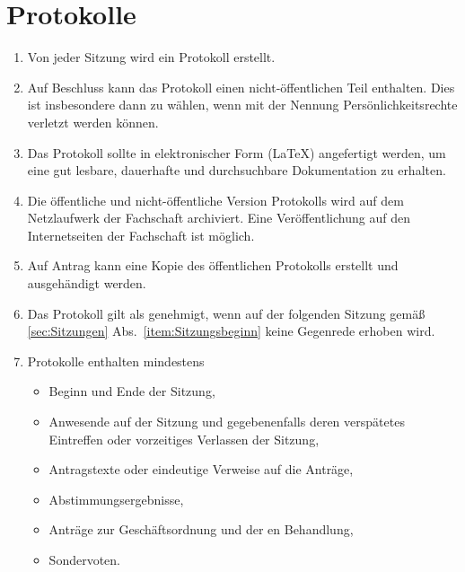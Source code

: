 \section{Protokolle}
\label{sec:protokolle}
\begin{enumerate}
	\item Von jeder Sitzung wird ein Protokoll erstellt.
	\item Auf Beschluss kann das Protokoll einen nicht-öffentlichen Teil enthalten.
	Dies ist insbesondere dann zu wählen, wenn mit der Nennung Persönlichkeitsrechte verletzt werden können.
	\item Das Protokoll sollte in elektronischer Form (\LaTeX) angefertigt werden, um eine gut lesbare, dauerhafte und durchsuchbare Dokumentation zu erhalten.
	\item Die öffentliche und nicht-öffentliche Version Protokolls wird auf dem Netzlaufwerk der Fachschaft archiviert.
	Eine Veröffentlichung auf den Internetseiten der Fachschaft ist möglich.
	\item Auf Antrag kann eine Kopie des öffentlichen Protokolls erstellt und ausgehändigt werden.
	\item Das Protokoll gilt als genehmigt, wenn auf der folgenden Sitzung gemäß \ref{sec:Sitzungen} Abs.~\ref{item:Sitzungsbeginn} keine Gegenrede erhoben wird.
	\item Protokolle enthalten mindestens
	\begin{itemize}
		\item Beginn und Ende der Sitzung,
		\item Anwesende auf der Sitzung und gegebenenfalls deren verspätetes Eintreffen oder vorzeitiges Verlassen der Sitzung,
		\item Antragstexte oder eindeutige Verweise auf die Anträge,
		\item Abstimmungsergebnisse,
		\item Anträge zur Geschäftsordnung und der en Behandlung,
		\item Sondervoten.
	\end{itemize}
\end{enumerate}

